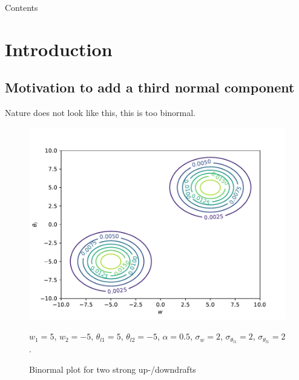 \documentclass[10pt]{beamer}
\title{\mytitle}
\author[\myauthor]{\myauthor}
\institute[UWM]{University of Wisconsin Milwaukee}
\date[May 3, 2024]{May 3, 2024}
\numberwithin{equation}{section}
\begin{document}
    \frame{\titlepage}

    \begin{frame}{Contents}
        \tableofcontents
    \end{frame}


    \section{Introduction}\label{sec:introduction}

    \subsection{Motivation to add a third normal component}
    \label{subsec:motivation-to-add-a-third-normal-component}

    \begin{frame}
        \begin{large}
            Nature does not look like this, this is too binormal.
        \end{large}
        \begin{figure}[!htb]
            \centering
            \includegraphics[width=.5\textwidth]{include/figures/plot1}
            \caption{Binormal plot for two strong up-/downdrafts}
            \label{fig:plot1}
            $w_1 = 5$, $w_2 = -5$, $\theta_{l1} = 5$, $\theta_{l2} = -5$,
            $\alpha = 0.5$, $\sigma_w = 2$, $\sigma_{\theta_{l1}} = 2$, $\sigma_{\theta_{l1}} = 2$.
        \end{figure}
    \end{frame}
\end{document}
